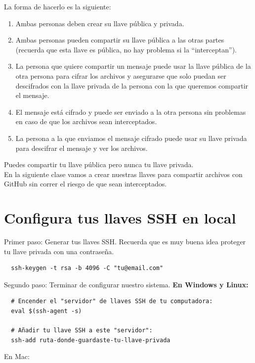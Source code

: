 \documentclass{article}
\begin{document}
La forma de hacerlo es la siguiente:

\begin{enumerate}
  \item Ambas personas deben crear su llave pública y privada.
  \item Ambas personas pueden compartir su llave pública a las otras partes
    (recuerda que esta llave es pública, no hay problema si la “interceptan”).
  \item La persona que quiere compartir un mensaje puede usar la llave pública
    de la otra persona para cifrar los archivos y asegurarse que solo puedan
    ser descifrados con la llave privada de la persona con la que queremos
    compartir el mensaje.
  \item El mensaje está cifrado y puede ser enviado a la otra persona sin
    problemas en caso de que los archivos sean interceptados.
  \item La persona a la que enviamos el mensaje cifrado puede usar su llave
    privada para descifrar el mensaje y ver los archivos.
\end{enumerate}

Puedes compartir tu llave pública pero nunca tu llave privada.\\

En la siguiente clase vamos a crear nuestras llaves para compartir archivos con
GitHub sin correr el riesgo de que sean interceptados.\\


\section{Configura tus llaves SSH en local}%
Primer paso: Generar tus llaves SSH. Recuerda que es muy buena idea proteger tu
llave privada con una contraseña.

\begin{verbatim}
  ssh-keygen -t rsa -b 4096 -C "tu@email.com"
\end{verbatim}

Segundo paso: Terminar de configurar nuestro sistema.
\textbf{En Windows y Linux:}
\begin{verbatim}
  # Encender el "servidor" de llaves SSH de tu computadora:
  eval $(ssh-agent -s)

  # Añadir tu llave SSH a este "servidor":
  ssh-add ruta-donde-guardaste-tu-llave-privada
\end{verbatim}

En Mac:
\end{document}
